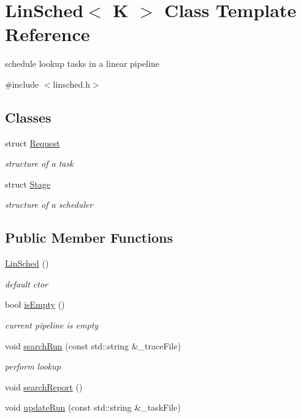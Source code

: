 \hypertarget{classLinSched}{\section{Lin\-Sched$<$ K $>$ Class Template Reference}
\label{classLinSched}
}


schedule lookup tasks in a linear pipeline  




{\ttfamily \#include $<$linsched.\-h$>$}

\subsection*{Classes}
\begin{DoxyCompactItemize}
\item 
struct \hyperlink{structLinSched_1_1Request}{Request}
\begin{DoxyCompactList}\small\item\em structure of a task \end{DoxyCompactList}\item 
struct \hyperlink{structLinSched_1_1Stage}{Stage}
\begin{DoxyCompactList}\small\item\em structure of a scheduler \end{DoxyCompactList}\end{DoxyCompactItemize}
\subsection*{Public Member Functions}
\begin{DoxyCompactItemize}
\item 
\hyperlink{classLinSched_a11873ccd556cc6ae26d714078cc80fd1}{Lin\-Sched} ()
\begin{DoxyCompactList}\small\item\em default ctor \end{DoxyCompactList}\item 
bool \hyperlink{classLinSched_a776d6ffd758776074548113051204078}{is\-Empty} ()
\begin{DoxyCompactList}\small\item\em current pipeline is empty \end{DoxyCompactList}\item 
void \hyperlink{classLinSched_ad3abe827088ec3b62a0329457378691a}{search\-Run} (const std\-::string \&\-\_\-trace\-File)
\begin{DoxyCompactList}\small\item\em perform lookup \end{DoxyCompactList}\item 
void \hyperlink{classLinSched_a96e1746d1a2579b001d59685ddddfd94}{search\-Report} ()
\item 
void \hyperlink{classLinSched_a09e9f09b9b77c841b870e1815e093cd0}{update\-Run} (const std\-::string \&\-\_\-task\-File)
\end{DoxyCompactItemize}
